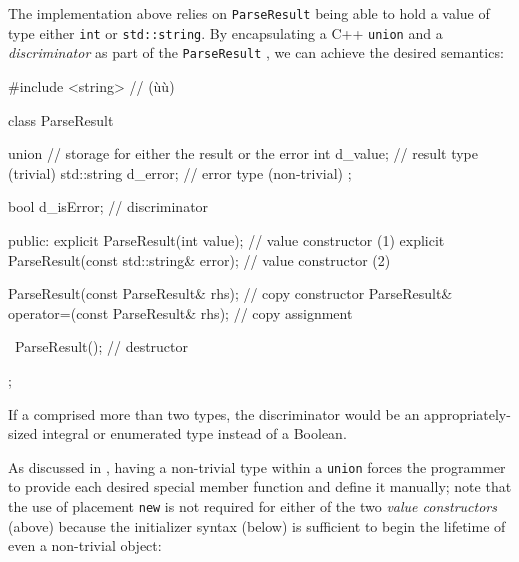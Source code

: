 \noindent The implementation above relies on \lstinline!ParseResult! being able to
hold a value of type either \lstinline!int! or \lstinline!std::string!. By
encapsulating a C++ \lstinline!union! and a \emph{discriminator} as part
of the \lstinline!ParseResult! , we can achieve the
desired semantics:

%
%
%
%
\begin{emcppshiddenlisting}[emcppsbatch=e6]
#include <string>   // (ù{}ù)
\end{emcppshiddenlisting}
\begin{emcppslisting}[emcppsbatch=e6]
class ParseResult
{
    union  // storage for either the result or the error
    {
        int         d_value; // result type (trivial)
        std::string d_error; // error  type (non-trivial)
    };

    bool d_isError;  // discriminator

public:
    explicit ParseResult(int value);                 // value constructor (1)
    explicit ParseResult(const std::string& error);  // value constructor (2)

    ParseResult(const ParseResult& rhs);             // copy constructor
    ParseResult& operator=(const ParseResult& rhs);  // copy assignment

    ~ParseResult();                                  // destructor
};
\end{emcppslisting}


\noindent If a  comprised more than two types, the discriminator would be an appropriately-sized integral or enumerated type instead of a Boolean.

As discussed in
, having a non-trivial
type within a \lstinline!union! forces the programmer to provide each
desired special member function and define it manually; note
that the use of placement \lstinline!new! is not required for either of the
two \emph{value constructors} (above) because the initializer syntax
(below) is sufficient to begin the lifetime of even a non-trivial
object:

